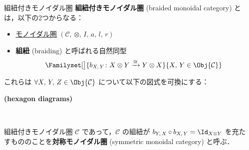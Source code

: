 \documentclass[TQFT_main]{subfiles}
\begin{document}
\begin{mydef}[label=redef:braided-monoidal]{組紐付きモノイダル圏}
    \textbf{組紐付きモノイダル圏} (braided monoidal category) とは，以下の2つからなる：
    \begin{itemize}
        \item \hyperref[redef:monoidal-category]{モノイダル圏} $(\mathcal{C},\, \otimes,\, I,\, a,\, l,\, r)$
        \item \textbf{組紐} (braiding) と呼ばれる自然同型
        \begin{align}
            \Familyset[\big]{b_{X,\, Y} \colon X \otimes Y \xrightarrow{\cong} Y \otimes X}{X,\, Y \in \Obj{\mathcal{C}}}
        \end{align}
    \end{itemize}
    これらは $\forall X,\, Y,\, Z \in \Obj{\mathcal{C}}$ について以下の図式を可換にする：
    \begin{description}
        \item[\textbf{(hexagon diagrams)}]　
        
        \begin{center}
        \end{center}
        
        \begin{center}
        \end{center}
    \end{description}
    \tcblower
    組紐付きモノイダル圏 $\mathcal{C}$ であって，$\mathcal{C}$ の組紐が $b_{Y,\, X} \circ b_{X,\, Y} = \Id_{X \otimes Y}$ を充たすもののことを\textbf{対称モノイダル圏} (symmetric monoidal category) と呼ぶ．
\end{mydef}
\end{document}
